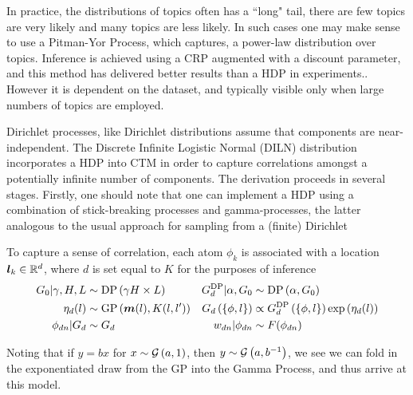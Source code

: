 In practice, the distributions of topics often has a ``long" tail, there are few topics are very likely and many topics are less likely\cite{Wallach2009a}. In such cases one may make sense to use a Pitman-Yor Process, which captures, a power-law distribution over topics. Inference is achieved using a CRP augmented with a discount parameter, and this method has delivered better results than a HDP in experiments.\cite{Buntine2014}. However it is dependent on the dataset, and typically visible only when large numbers of topics are employed. 

Dirichlet processes, like Dirichlet distributions assume that components are near-independent. The Discrete Infinite Logistic Normal (DILN) distribution\cite{Paisley2012}\cite{Paisley2012b} incorporates a HDP into CTM in order to capture correlations amongst a potentially infinite number of components. The derivation proceeds in several stages. 
Firstly, one should note that one can implement a HDP using a combination of stick-breaking processes and gamma-processes, the latter analogous to the usual approach for sampling from a (finite) Dirichlet

To capture a sense of correlation, each atom $\phi_k$ is associated with a location $\bm l_k \in { \mathbb{R}^{d} }$, where $d$ is set equal to $K$ for the purposes of inference
\begin{align}
G_0 | \gamma, H, L & \sim \text{DP} \left( {\gamma H \times L } \right) &
G_d^{\text{DP}} | \alpha, G_0 & \sim \text{DP} \left( {\alpha, G_0} \right) \\
\eta_d(l) & \sim \text{GP} \left( {\bm m(l)}, {K(l, l')} \right) &
G_d\left(\{\phi, l\}\right) & \propto G_d^{\text{DP}}\left(\{\phi, l\}\right) \exp\left(\eta_d(l) \right) \\
\phi_{dn} |G_d &\sim G_d & w_{dn} | \phi_{dn} & \sim F(\phi_{dn})
\end{align}

Noting that if $y = bx$ for $x \sim \mathcal{G} \left( {a}, {1} \right)$, then $y \sim \mathcal{G} \left( {a}, {b^{-1}} \right)$, we see we can fold in the exponentiated draw from the GP into the Gamma Process, and thus arrive at this model.

